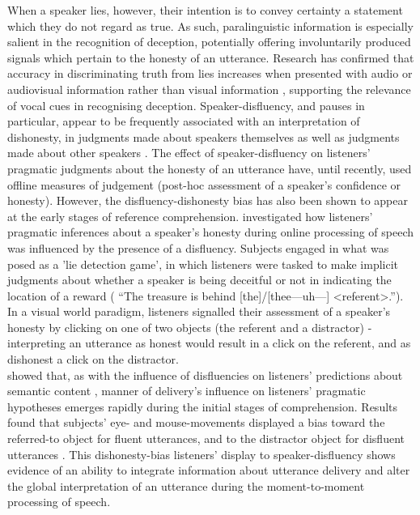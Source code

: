 \documentclass[man]{apa6}
\begin{document}
When a speaker lies, however, their intention is to convey certainty a statement which they do not regard as true. 
As such, paralinguistic information is especially salient in the recognition of deception, potentially offering involuntarily produced signals which pertain to the honesty of an utterance.
Research has confirmed that accuracy in discriminating truth from lies increases when presented with audio or audiovisual information rather than visual information \citep{Bond2006}, supporting the relevance of vocal cues in recognising deception.
Speaker-disfluency, and pauses in particular, appear to be frequently associated with an interpretation of dishonesty, in judgments made about speakers themselves as well as judgments made about other speakers \citep{Zuckerman1981}. 
The effect of speaker-disfluency on listeners' pragmatic judgments about the honesty of an utterance have, until recently, used offline measures of judgement (post-hoc assessment of a speaker's confidence or honesty). 
However, the disfluency-dishonesty bias has also been shown to appear at the early stages of reference comprehension. 
\citet{Loy2016} investigated how listeners' pragmatic inferences about a speaker's honesty during online processing of speech was influenced by the presence of a disfluency. 
Subjects engaged in what was posed as a 'lie detection game', in which listeners were tasked to make implicit judgments about whether a speaker is being deceitful or not in indicating the location of a reward ( ``The treasure is behind [the]/[thee---uh---] \textless referent\textgreater .''). 
In a visual world paradigm, listeners signalled their assessment of a speaker's honesty by clicking on one of two objects (the referent and a distractor) - interpreting an utterance as honest would result in a click on the referent, and as dishonest a click on the distractor.\\

\citet{Loy2016} showed that, as with the influence of disfluencies on listeners' predictions about semantic content \citep{Arnold2004, Arnold2007, Barr2001}, manner of delivery's influence on listeners' pragmatic hypotheses emerges rapidly during the initial stages of comprehension. 
Results found that subjects' eye- and mouse-movements displayed a bias toward the referred-to object for fluent utterances, and to the distractor object for disfluent utterances \citep{Loy2016}.
This dishonesty-bias listeners' display to speaker-disfluency shows evidence of an ability to integrate information about utterance delivery and alter the global interpretation of an utterance during the moment-to-moment processing of speech.\\
\end{document}
